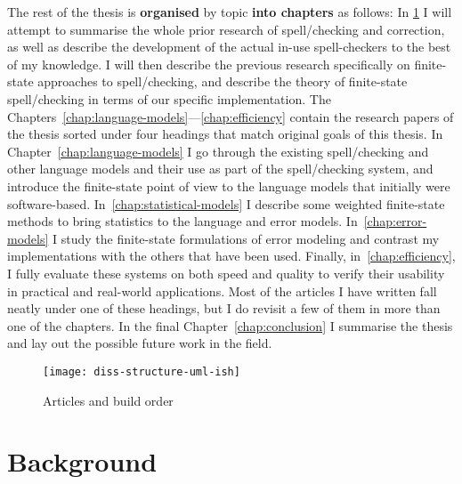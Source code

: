\documentclass[officiallayout]{unihelcompling}
\begin{document}
The rest of the thesis is \textbf{organised} by topic \textbf{into chapters} as
follows: In \ref{chap:background} I will attempt to summarise the whole prior
research of spell\-/checking and correction, as well as describe the
development of the actual in-use spell-checkers to the best of my knowledge. I
will then describe the previous research specifically on finite-state
approaches to spell\-/checking, and describe the theory of finite-state
spell\-/checking in terms of our specific implementation. The
Chapters~\ref{chap:language-models}---\ref{chap:efficiency} contain the
research papers of the thesis sorted under four headings that match original
goals of this thesis.  In Chapter~\ref{chap:language-models} I go through the
existing spell\-/checking and other language models and their use as part of
the spell\-/checking system, and introduce the finite-state point of view to
the language models that initially were software-based.
In~\ref{chap:statistical-models} I describe some weighted finite-state methods
to bring statistics to the language and error models.
In~\ref{chap:error-models} I study the finite-state formulations of error
modeling and contrast my implementations with the others that have been used.
Finally, in~\ref{chap:efficiency}, I fully evaluate these systems on both speed
and quality to verify their usability in practical and real-world applications.
Most of the articles I have written fall neatly under one of these headings,
but I do revisit a few of them in more than one of the chapters. In the final
Chapter~\ref{chap:conclusion} I summarise the thesis and lay out the possible
future work in the field.

\begin{figure}
    \texttt{[image: diss-structure-uml-ish]}
    \caption{Articles and build order
    \label{fig:schematic-diagram}}
\end{figure}

\chapter{Background}
\label{chap:background}
\end{document}
